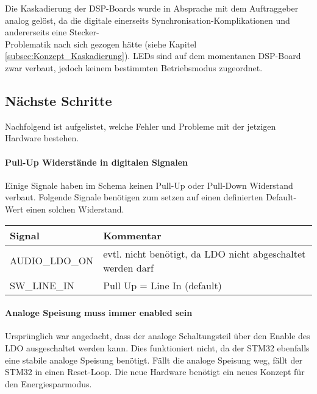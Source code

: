 Die Kaskadierung der DSP-Boards wurde in Absprache mit dem Auftraggeber analog gelöst, da die digitale einerseits Synchronisation-Komplikationen und andererseits eine Stecker-\\Problematik nach sich gezogen hätte (siehe Kapitel \ref{subsec:Konzept_Kaskadierung}). LEDs sind auf dem momentanen DSP-Board zwar verbaut, jedoch keinem bestimmten Betriebsmodus zugeordnet.

\clearpage

\subsection{Nächste Schritte}

Nachfolgend ist aufgelistet, welche Fehler und Probleme mit der jetzigen Hardware bestehen.

\paragraph{Pull-Up Widerstände in digitalen Signalen}

Einige Signale haben im Schema keinen Pull-Up oder Pull-Down Widerstand verbaut.
Folgende Signale benötigen zum setzen auf einen definierten Default-Wert einen solchen Widerstand.
\begin{table}[H]
	\centering
	\begin{tabular}{|l|l|}
		\hline
		\textbf{Signal} & \textbf{Kommentar}                                          \\ \hline
		AUDIO\_LDO\_ON  & evtl. nicht benötigt, da LDO nicht abgeschaltet werden darf \\ \hline
		SW\_LINE\_IN    & Pull Up = Line In (default)                                 \\ \hline
	\end{tabular}
\end{table}

\paragraph{Analoge Speisung muss immer enabled sein}

Ursprünglich war angedacht, dass der analoge Schaltungsteil über den Enable des LDO ausgeschaltet werden kann. Dies funktioniert nicht, da der STM32 ebenfalls eine stabile analoge Speisung benötigt. Fällt die analoge Speisung weg, fällt der STM32 in einen Reset-Loop.
Die neue Hardware benötigt ein neues Konzept für den Energiesparmodus.

